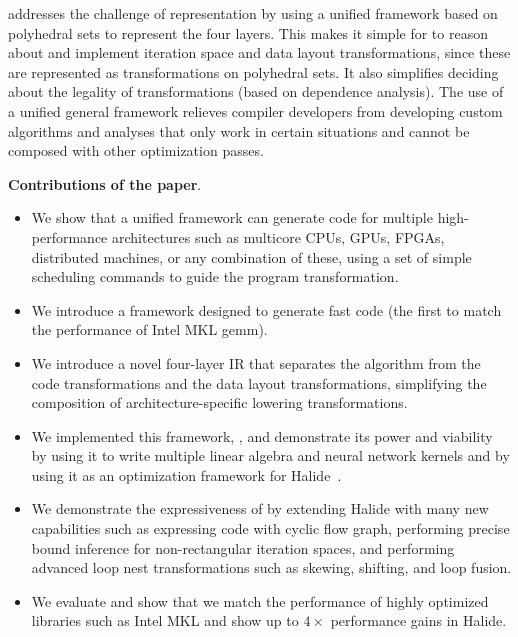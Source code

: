 \framework{} addresses the challenge of representation by using a unified framework based on polyhedral sets to represent the four layers.  This makes it simple for \framework{} to reason about and implement iteration space and data layout transformations, since these are represented as transformations on polyhedral sets.  It also simplifies deciding about the legality of transformations (based on dependence analysis).  The use of a unified general framework relieves compiler developers from developing custom algorithms and analyses that only work in certain situations and cannot be composed with other optimization passes.\newline

\noindent \textbf{Contributions of the paper}.
\vspace{-0.2cm}
\begin{itemize}
  \item We show that a unified framework can generate code for multiple high-performance architectures such as multicore CPUs, GPUs, FPGAs, distributed machines, or any combination of these, using a set of simple scheduling commands to guide the program transformation.

  \item We introduce a framework designed to generate fast code (the first to match the performance of Intel MKL gemm).

  \item We introduce a novel four-layer IR that separates the algorithm from the code transformations and the data layout transformations, simplifying the composition of architecture-specific lowering transformations.

  \item We implemented this framework, \framework{}, and demonstrate its power and viability by using it to write multiple linear algebra and neural network kernels and by using it as an optimization framework for  Halide~\cite{halide_12,DBLP:conf/pldi/Ragan-KelleyBAPDA13}.

  \item We demonstrate the expressiveness of \framework{} by extending Halide with many new capabilities such as expressing code with cyclic flow graph, performing precise bound inference for non-rectangular iteration spaces, and performing advanced loop nest transformations such as skewing, shifting, and loop fusion.

  \item We evaluate \framework{} and show that we match the performance of highly optimized libraries such as Intel MKL and show up to $4\times$ performance gains in Halide.
\end{itemize}
